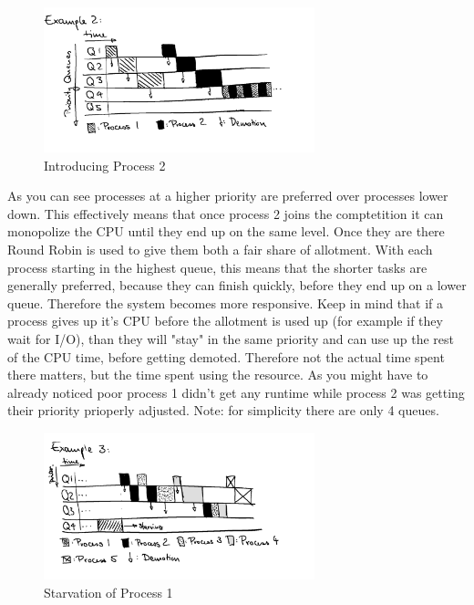\documentclass{report}
\begin{document}
\begin{figure}[h]
  \begin{center}
    \includegraphics[width=0.7\textwidth]{assets/mlfq-diag-2.png}
    \caption{Introducing Process 2}
    \label{mlfq-diag-2}
  \end{center}
\end{figure}

As you can see processes at a higher priority are preferred over processes lower down. 
This effectively means that once process 2 joins the comptetition it can monopolize the CPU until they end up on the same level.
Once they are there Round Robin is used to give them both a fair share of allotment.
With each process starting in the highest queue, this means that the shorter tasks are generally preferred, because they can finish quickly, before they end up on a lower queue. Therefore the system becomes more responsive.
Keep in mind that if a process gives up it's CPU before the allotment is used up (for example if they wait for I/O), than they will "stay" in the same priority and can use up the rest of the CPU time, before getting demoted.
Therefore not the actual time spent there matters, but the time spent using the resource.
As you might have to already noticed poor process 1 didn't get any runtime while process 2 was getting their priority prioperly adjusted. Note: for simplicity there are only 4 queues.

\begin{figure}[h]
  \begin{center}
    \includegraphics[width=0.7\textwidth]{assets/mlfq-diag-3.png}
    \caption{Starvation of Process 1}
    \label{mlfq-diag-3}
  \end{center}
\end{figure}
\end{document}
